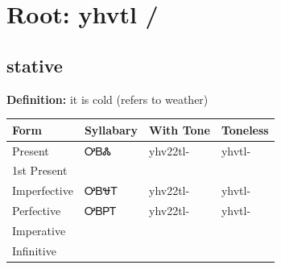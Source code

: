 \documentclass{article}%
\begin{document}
%
\normalsize%
\section*{Root: yhvtl / }%
\subsection*{stative}%
\textbf{Definition: }%
it is cold (refers to weather)%
\\[0.5em]%
\begin{tabular}{|l|l|l|l|}%
\hline%
\textbf{Form}&\textbf{Syllabary}&\textbf{With Tone}&\textbf{Toneless}\\%
\hline%
Present&ᎤᏴᏜ&yhv22tl{-}&yhvtl{-}\\%
1st Present&&&\\%
Imperfective&ᎤᏴᏠᎢ&yhv22tl{-}&yhvtl{-}\\%
Perfective&ᎤᏴᏢᎢ&yhv22tl{-}&yhvtl{-}\\%
Imperative&&&\\%
Infinitive&&&\\%
\hline%
\end{tabular}%
\\[1em]%
\end{document}
